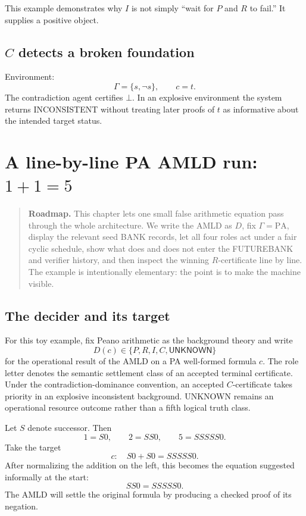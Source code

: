 \documentclass[11pt,openany]{book}
\theoremstyle{definition}
\theoremstyle{remark}
\newenvironment{roadmap}{\begin{quote}\small\color{deepblue}\textbf{Roadmap.} }{\end{quote}}
\newcommand{\botc}{\bot}
\begin{document}
This example demonstrates why $I$ is not simply ``wait for $P$ and $R$ to fail.'' It supplies a positive object.

\section{\texorpdfstring{$C$ detects a broken foundation}{C detects a broken foundation}}
Environment:
\[
\Gamma=\{s,\neg s\},\qquad c=t.
\]
The contradiction agent certifies $\botc$. In an explosive environment the system returns \textsf{INCONSISTENT} without treating later proofs of $t$ as informative about the intended target status.

\chapter{A line-by-line PA AMLD run: \texorpdfstring{$1+1=5$}{1+1=5}}\label{ch:pa115}
\begin{roadmap}
This chapter lets one small false arithmetic equation pass through the whole architecture. We write the AMLD as $D$, fix $\Gamma=\mathrm{PA}$, display the relevant seed BANK records, let all four roles act under a fair cyclic schedule, show what does and does not enter the FUTUREBANK and verifier history, and then inspect the winning $R$-certificate line by line. The example is intentionally elementary: the point is to make the machine visible.
\end{roadmap}

\section{The decider and its target}
For this toy example, fix Peano arithmetic as the background theory and write
\[
D(c)\in\{P,R,I,C,\textsf{UNKNOWN}\}
\]
for the operational result of the AMLD on a PA well-formed formula $c$. The role letter denotes the semantic settlement class of an accepted terminal certificate. Under the contradiction-dominance convention, an accepted $C$-certificate takes priority in an explosive inconsistent background. \textsf{UNKNOWN} remains an operational resource outcome rather than a fifth logical truth class.

Let $S$ denote successor. Then
\[
1=S0,\qquad 2=SS0,\qquad 5=SSSSS0.
\]
Take the target
\[
c:\quad S0+S0=SSSSS0.
\]
After normalizing the addition on the left, this becomes the equation suggested informally at the start:
\[
SS0=SSSSS0.
\]
The AMLD will settle the original formula by producing a checked proof of its negation.
\end{document}
